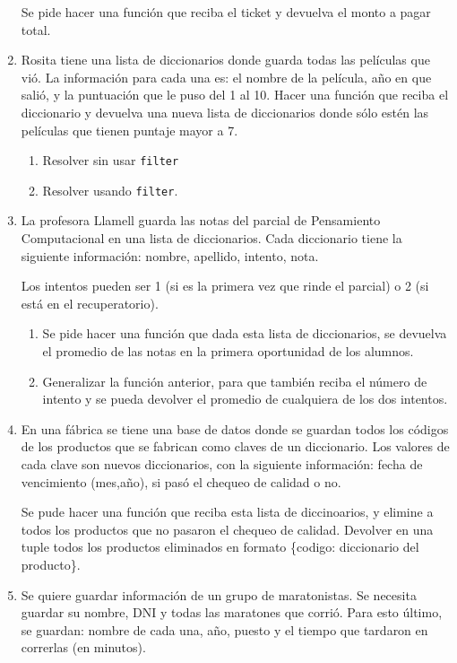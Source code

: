 \documentclass[
  letterpaper,
  DIV=11,
  numbers=noendperiod]{scrreprt}
\providecommand{\tightlist}{%
  \setlength{\itemsep}{0pt}\setlength{\parskip}{0pt}}\usepackage{longtable,booktabs,array}
\begin{document}
\begin{enumerate}
  Se pide hacer una función que reciba el ticket y devuelva el monto a
  pagar total.
\item
  Rosita tiene una lista de diccionarios donde guarda todas las
  películas que vió. La información para cada una es: el nombre de la
  película, año en que salió, y la puntuación que le puso del 1 al 10.
  Hacer una función que reciba el diccionario y devuelva una nueva lista
  de diccionarios donde sólo estén las películas que tienen puntaje
  mayor a 7.

  \begin{enumerate}
  \def\labelenumii{\alph{enumii}.}
  \tightlist
  \item
    Resolver sin usar \texttt{filter}
  \item
    Resolver usando \texttt{filter}.
  \end{enumerate}
\item
  La profesora Llamell guarda las notas del parcial de Pensamiento
  Computacional en una lista de diccionarios. Cada diccionario tiene la
  siguiente información: nombre, apellido, intento, nota.

  Los intentos pueden ser 1 (si es la primera vez que rinde el parcial)
  o 2 (si está en el recuperatorio).

  \begin{enumerate}
  \def\labelenumii{\alph{enumii}.}
  \item
    Se pide hacer una función que dada esta lista de diccionarios, se
    devuelva el promedio de las notas en la primera oportunidad de los
    alumnos.
  \item
    Generalizar la función anterior, para que también reciba el número
    de intento y se pueda devolver el promedio de cualquiera de los dos
    intentos.
  \end{enumerate}
\item
  En una fábrica se tiene una base de datos donde se guardan todos los
  códigos de los productos que se fabrican como claves de un
  diccionario. Los valores de cada clave son nuevos diccionarios, con la
  siguiente información: fecha de vencimiento (mes,año), si pasó el
  chequeo de calidad o no.

  Se pude hacer una función que reciba esta lista de diccinoarios, y
  elimine a todos los productos que no pasaron el chequeo de calidad.
  Devolver en una tuple todos los productos eliminados en formato
  \{codigo: diccionario del producto\}.
\item
  Se quiere guardar información de un grupo de maratonistas. Se necesita
  guardar su nombre, DNI y todas las maratones que corrió. Para esto
  último, se guardan: nombre de cada una, año, puesto y el tiempo que
  tardaron en correrlas (en minutos).


\end{enumerate}
\end{document}
